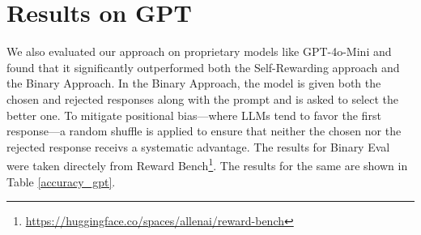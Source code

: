 \section{Results on GPT}
\label{GPT_Results}
We also evaluated our approach on proprietary models like GPT-4o-Mini and found that it significantly outperformed both the Self-Rewarding approach and the Binary Approach. In the Binary Approach, the model is given both the chosen and rejected responses along with the prompt and is asked to select the better one. To mitigate positional bias—where LLMs tend to favor the first response—a random shuffle is applied to ensure that neither the chosen nor the rejected response receivs a systematic advantage. The results for Binary Eval were taken directely from Reward Bench\footnote{\url{https://huggingface.co/spaces/allenai/reward-bench}}.  The results for the same are shown in Table \ref{accuracy_gpt}.